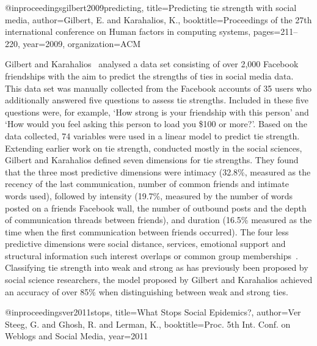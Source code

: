 

@inproceedings{gilbert2009predicting,
  title={Predicting tie strength with social media},
  author={Gilbert, E. and Karahalios, K.},
  booktitle={Proceedings of the 27th international conference on Human factors in computing systems},
  pages={211--220},
  year={2009},
  organization={ACM}
}

Gilbert and Karahalios~\cite{gilbert2009predicting} analysed a data
set consisting of over 2,000 Facebook friendships with the aim to
predict the strengths of ties in social media data. This data set was
manually collected from the Facebook accounts of 35 users who
additionally answered five questions to assess tie strengths. Included
in these five questions were, for example, `How strong is your
friendship with this person' and `How would you feel asking this person
to load you \$100 or more?'. Based on the data collected, 74 variables
were used in a linear model to predict tie strength. Extending earlier
work on tie strength, conducted mostly in the social sciences, Gilbert
and Karahalios defined seven dimensions for tie strengths. They found
that the three most predictive dimensions were intimacy (32.8\%,
measured as the recency of the last communication, number of common
friends and intimate words used), followed by intensity (19.7\%,
measured by the number of words posted on a friends Facebook wall, the
number of outbound posts and the depth of communication threads
between friends), and duration (16.5\% measured as the time when the
first communication between friends occurred). The four less predictive
dimensions were social distance, services, emotional support and
structural information such interest overlaps or common group
memberships~\cite{gilbert2009predicting}. Classifying tie strength
into weak and strong as has previously been proposed by social science
researchers, the model proposed by Gilbert and Karahalios achieved an
accuracy of over 85\% when distinguishing between weak and strong ties.



@inproceedings{ver2011stops,
  title={What Stops Social Epidemics?},
  author={Ver Steeg, G. and Ghosh, R. and Lerman, K.},
  booktitle={Proc. 5th Int. Conf. on Weblogs and Social Media},
  year={2011}
}

